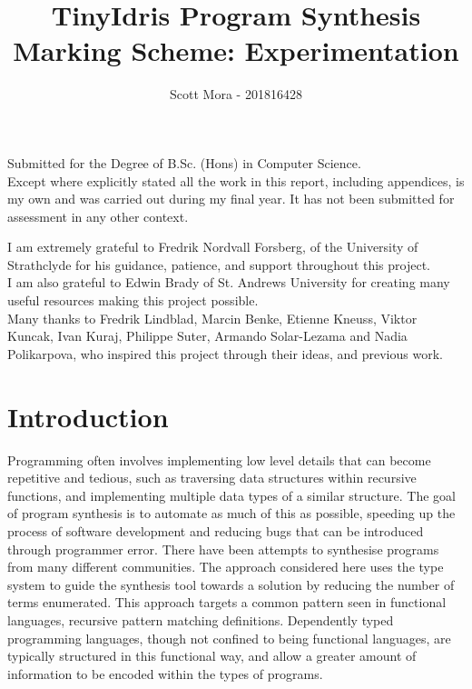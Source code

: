 \documentclass[a4paper]{article}
\author{Scott Mora - 201816428}
\date{}
\title{TinyIdris Program Synthesis\\\medskip
\large Marking Scheme: Experimentation}
\begin{document}
\maketitle
\begin{center}
\vspace{15mm}
Submitted for the Degree of B.Sc. (Hons) in Computer Science. \\
\vspace{15mm}
Except where explicitly stated all the work in this report, including appendices, is my own and was carried out during my final year. It has not been submitted for assessment in any other context. 
 \end{center}
\clearpage
\tableofcontents
\clearpage

\thispagestyle{empty}
    \null{}
        \begin{center}
          I am extremely grateful to Fredrik Nordvall Forsberg, of
          the University of Strathclyde for his guidance,
          patience, and support throughout this project.\\
\vspace{10mm}
          I am also grateful to Edwin Brady of St. Andrews University
          for creating many useful resources making this project possible. \\
\vspace{10mm}
          Many thanks to Fredrik Lindblad, Marcin Benke, Etienne Kneuss, Viktor Kuncak,
          Ivan Kuraj, Philippe Suter, Armando Solar-Lezama and Nadia Polikarpova,
          who inspired this project through their ideas, and previous work.
        \end{center}
\null
\clearpage


\section{Introduction}
\label{sec:orgf1aad56}

Programming often involves implementing low level details that can
become repetitive and tedious, such as traversing data structures
within recursive functions, and implementing multiple data types of a similar structure.
The goal of program synthesis is to automate as much of this as
possible, speeding up the process of software development and reducing
bugs that can be introduced through programmer error. There have been
attempts to synthesise programs from many different communities.
The approach considered here uses the type system to guide the synthesis
tool towards a solution by reducing the number of terms enumerated.
This approach targets a common pattern seen in functional languages,
recursive pattern matching definitions. Dependently typed programming languages, 
though not confined to being functional languages, are typically 
structured in this functional way, and allow a greater amount of 
information to be encoded within the types of programs. 
\end{document}
